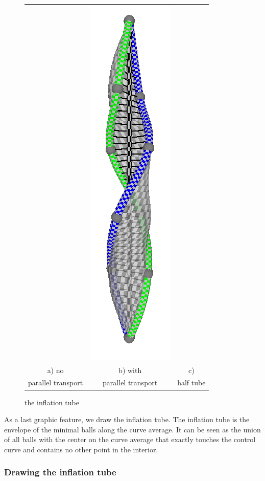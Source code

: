 \documentclass[journal, letterpaper]{IEEEtran}
\begin{document}
\begin{figure}
\begin{tabular}{ccc}
				& \includegraphics[scale=0.7]{images/InflationHalf.png}\\
			a) no  & b) with & c) \\
			parallel transport & parallel transport & half tube
		\end{tabular}
	\caption{the inflation tube}
	\label{fig:Inflation}
\end{figure}
As a last graphic feature, we draw the inflation tube. The inflation tube is the envelope of the minimal balls along the curve average.
It can be seen as the union of all balls with the center on the curve average that exactly touches the control curve and contains no other point in the interior.

\subsubsection{Drawing the inflation tube}
\end{document}
